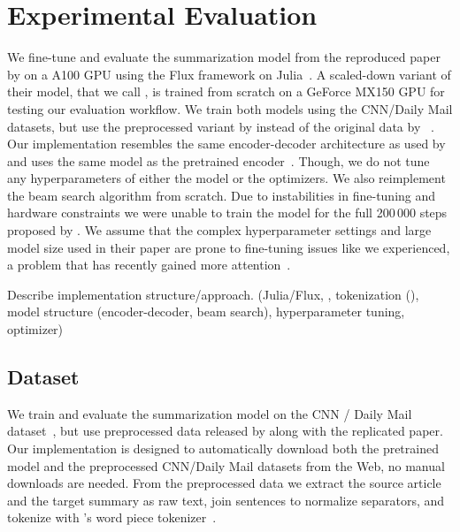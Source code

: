\section{Experimental Evaluation} %

We fine-tune and evaluate the \BertSumAbs summarization model from the reproduced paper by \citeauthor{LiuL2019} on a A100 GPU using the Flux framework on Julia~\cite{InnesSFGRJKPS2018,BezansonEKS2017,LiuL2019}.
A scaled-down variant of their \TransformerAbs model, that we call \TransformerAbsTiny, is trained from scratch on a GeForce MX150 GPU for testing our evaluation workflow.
We train both models using the CNN/Daily Mail datasets, but use the preprocessed variant by \citeauthor{LiuL2019} instead of the original data by \citeauthor{HermannKGEKSB2015}~\cite{LiuL2019,HermannKGEKSB2015}.
Our implementation resembles the same encoder-decoder architecture as used by \citeauthor{LiuL2019} and uses the same \BertBase model as the pretrained encoder~\cite{LiuL2019,DevlinCLT2019}.
Though, we do not tune any hyperparameters of either the model or the optimizers.
We also reimplement the beam search algorithm from scratch.
Due to instabilities in fine-tuning and hardware constraints we were unable to train the model for the full 200\,000 steps proposed by \citeauthor{LiuL2019}.
We assume that the complex hyperparameter settings and large model size used in their paper are prone to fine-tuning issues like we experienced, a problem that has recently gained more attention~\cite{DodgeISFHS2020
,ZhangWKWA2020,AghajanyanSGGZG2020}.


Describe implementation structure/approach. (Julia/Flux, , tokenization (\Bert), model structure (encoder-decoder, beam search), hyperparameter tuning, optimizer)

\subsection{Dataset}

We train and evaluate the summarization model on the CNN / Daily Mail dataset~\cite{HermannKGEKSB2015}, but use preprocessed data released by \citeauthor{LiuL2019} along with the replicated paper.
Our implementation is designed to automatically download both the pretrained \BertBase model and the preprocessed CNN/Daily Mail datasets from the Web, no manual downloads are needed.
From the preprocessed data we extract the source article and the target summary as raw text, join sentences to normalize separators, and tokenize with \Bert's word piece tokenizer~\cite{DevlinCLT2019}.

